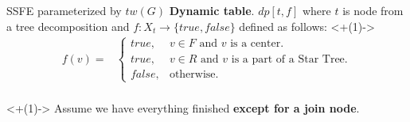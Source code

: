 \documentclass{beamer}
\begin{document}
\begin{frame}[t]{SSFE parameterized by $tw(G)$}
	\small
	\textbf{Dynamic table}. $dp[t, f]$ where $t$ is node from a tree decomposition and $f:X_t \rightarrow \{true, false\}$ defined as follows:
	\onslide<+(1)->{
		\begin{align*}
			f(v) =& \begin{cases}
				true, & \text{$v \in F$ and $v$ is a center.} \\
				true, & \text{$v \in R$ and $v$ is a part of a Star Tree.} \\
				false, &\text{otherwise.}
			\end{cases}\\
		\end{align*}
	}
	\bigskip

	\onslide<+(1)-> { Assume we have everything finished \textbf{except for a join node}. }
\end{frame}

\newcommand\drawpic[3]{
	\begin{tikzpicture}[node distance=2cm]
	
	\node[vertex2,label=below:{$f(w)=#1$}] (A) {w};
	\node[vertex2,label=below:{$f(u)=#2$}] (B) [right of=A] {u};
	\node[vertex2,label=above:{$f(v)=#3$}] (C) [above right of=A] {v};
	
	\path[iso] (A) edge node {} (B);
	\path[highlight] (B) edge node {} (C);
	\end{tikzpicture}
}

\newcommand\nextpicture[6]{
	\only<+(1)>{
		\begin{columns}
			\begin{column}{0.33\textwidth}
				\centering
				\textbf{($t_1$)}\\ \bigskip
				\drawpic{#1}{#2}{#3}
			\end{column}
			\begin{column}{0.33\textwidth}
				\centering
				\textbf{($t_2$)}\\ \bigskip
				\drawpic{#1}{#2}{#4}
			\end{column}
			\begin{column}{0.33\textwidth}
				\centering
				\textbf{($t$)}\\ \bigskip
				\drawpic{#1}{#2}{#5}
			\end{column}
		\end{columns}
		\centering
		\bigskip
		#6
	}
}
\end{document}
